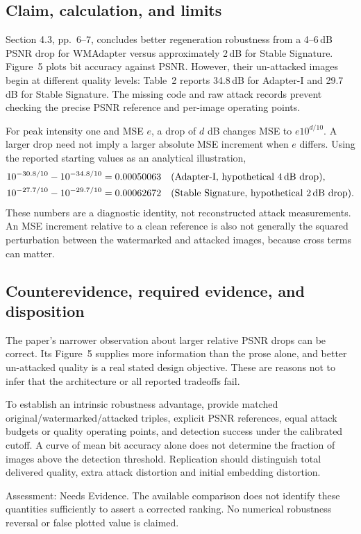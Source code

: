 \documentclass[10pt]{article}
\begin{document}
\subsection*{Claim, calculation, and limits}
Section 4.3, pp. 6–7, concludes better regeneration robustness from a 4–6 dB PSNR drop for WMAdapter versus approximately 2 dB for Stable Signature. Figure 5 plots bit accuracy against PSNR. However, their un-attacked images begin at different quality levels: Table 2 reports 34.8 dB for Adapter-I and 29.7 dB for Stable Signature. The missing code and raw attack records prevent checking the precise PSNR reference and per-image operating points.\par
For peak intensity one and MSE \(e\), a drop of \(d\) dB changes MSE to \(e10^{d/10}\). A larger drop need not imply a larger absolute MSE increment when \(e\) differs. Using the reported starting values as an analytical illustration, \[\begin{aligned}
 10^{-30.8/10}-10^{-34.8/10}&=0.00050063
 &&\text{(Adapter-I, hypothetical 4\,dB drop)},\\
 10^{-27.7/10}-10^{-29.7/10}&=0.00062672
 &&\text{(Stable Signature, hypothetical 2\,dB drop)}.
\end{aligned}\] These numbers are a diagnostic identity, not reconstructed attack measurements. An MSE increment relative to a clean reference is also not generally the squared perturbation between the watermarked and attacked images, because cross terms can matter.\par
\subsection*{Counterevidence, required evidence, and disposition}
The paper’s narrower observation about larger relative PSNR drops can be correct. Its Figure 5 supplies more information than the prose alone, and better un-attacked quality is a real stated design objective. These are reasons not to infer that the architecture or all reported tradeoffs fail.\par
To establish an intrinsic robustness advantage, provide matched original/watermarked/attacked triples, explicit PSNR references, equal attack budgets or quality operating points, and detection success under the calibrated cutoff. A curve of mean bit accuracy alone does not determine the fraction of images above the detection threshold. Replication should distinguish total delivered quality, extra attack distortion and initial embedding distortion.\par
Assessment: Needs Evidence. The available comparison does not identify these quantities sufficiently to assert a corrected ranking. No numerical robustness reversal or false plotted value is claimed.\par
\end{document}
